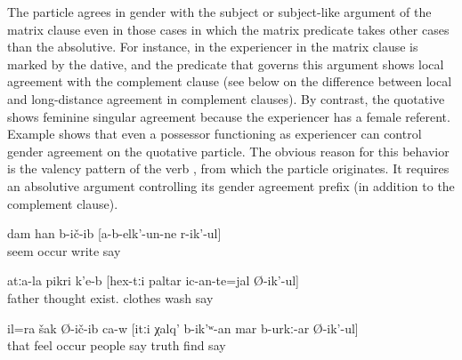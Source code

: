 The particle agrees in gender with the subject or subject-like argument of the matrix clause even in those cases in which the matrix predicate takes other cases than the absolutive. For instance, in  the experiencer in the matrix clause is marked by the dative, and the predicate that governs this argument shows local agreement with the complement clause (see  below on the difference between local and long-distance agreement in complement clauses). By contrast, the quotative shows feminine singular agreement because the experiencer has a female referent. Example  shows that even a possessor functioning as experiencer can control gender agreement on the quotative particle. The obvious reason for this behavior is the valency pattern of the verb  , from which the particle originates. It requires an absolutive argument controlling its gender agreement prefix (in addition to the complement clause).
%
\begin{exe}
	\ex	\label{ex:‎‎‎I thought that he did not write}
	\gll	dam	han	b-ič-ib	[a-b-elk'-un-ne	r-ik'-ul]\\
			seem	occur	write	say\\
	\glt	{}

	\ex	\label{ex:‎The father thinks about whether these clothes are to be washed.}
	\gll	atːa-la	pikri	k'e-b	[hex-tːi	paltar	ic-an-te=jal	Ø-ik'-ul]\\
		father	thought	exist.		clothes	wash	say\\
	\glt	{}

	\ex	\label{ex:He also guessed that the people had probably said the truth}
	\gll	il=ra	šak	Ø-ič-ib	ca-w	[itːi	χalq'	b-ik'ʷ-an	mar	b-urkː-ar	Ø-ik'-ul]\\
		that	feel	occur			people	say	truth	find	say\\
	\glt	{}
\end{exe}

